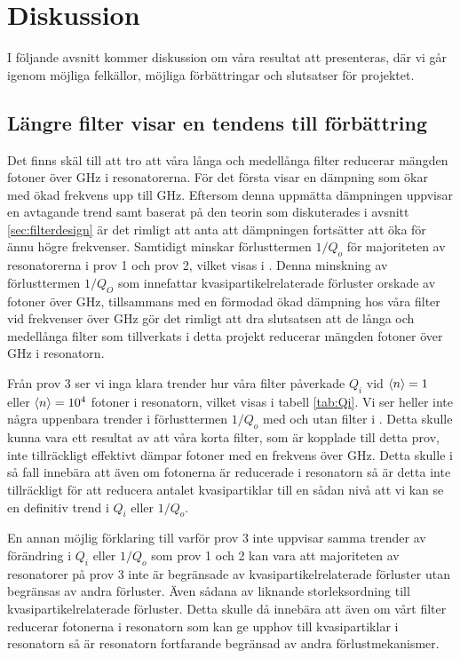 \documentclass[main.tex]{subfiles}
\begin{document}
\chapter{Diskussion}
\label{ch:discussion} 

I följande avsnitt kommer diskussion om våra resultat att presenteras, där vi går igenom möjliga felkällor, möjliga förbättringar och slutsatser för projektet. 

\section{Längre filter visar en tendens till förbättring}


Det finns skäl till att tro att våra långa och medellånga filter reducerar mängden fotoner över \unit[88]{GHz} i resonatorerna. För det första visar  en dämpning som ökar med ökad frekvens upp till \unit[50]{GHz}. Eftersom denna uppmätta dämpningen uppvisar en avtagande trend samt baserat på den teorin som diskuterades i avsnitt \ref{sec:filterdesign} är det rimligt att anta att dämpningen fortsätter att öka för ännu högre frekvenser. Samtidigt minskar förlusttermen $1/Q_o$ för majoriteten av resonatorerna i prov 1 och prov 2, vilket visas i . Denna minskning av förlusttermen $1/Q_O$ som innefattar kvasipartikelrelaterade förluster orskade av fotoner över \unit[88]{GHz}, tillsammans med en förmodad ökad dämpning hos våra filter vid frekvenser över \unit[50]{GHz} gör det rimligt att dra slutsatsen att de långa och medellånga filter som tillverkats i detta projekt reducerar mängden fotoner över \unit[88]{GHz} i resonatorn.

Från prov 3 ser vi inga klara trender hur våra filter påverkade $Q_i$ vid $\expval{n}=1$ eller $\expval{n}=10^4$ fotoner i resonatorn, vilket visas i tabell \ref{tab:Qi}. Vi ser heller inte några uppenbara trender i förlusttermen $1/Q_o$ med och utan filter i . Detta skulle kunna vara ett resultat av att våra korta filter, som är kopplade till detta prov, inte tillräckligt effektivt dämpar fotoner med en frekvens över \unit[88]{GHz}. Detta skulle i så fall innebära att även om fotonerna är reducerade i resonatorn så är detta inte tillräckligt för att reducera antalet kvasipartiklar till en sådan nivå att vi kan se en definitiv trend i $Q_i$ eller $1/Q_o$.

En annan möjlig förklaring till varför prov 3 inte uppvisar samma trender av förändring i $Q_i$ eller $1/Q_o$ som prov 1 och 2 kan vara att majoriteten av resonatorer på prov 3 inte är begränsade av kvasipartikelrelaterade förluster utan begränsas av andra förluster. Även sådana av liknande storleksordning till kvasipartikelrelaterade förluster. Detta skulle då innebära att även om vårt filter reducerar fotonerna i resonatorn som kan ge upphov till kvasipartiklar i resonatorn så är resonatorn fortfarande begränsad av andra förlustmekanismer.
\end{document}
